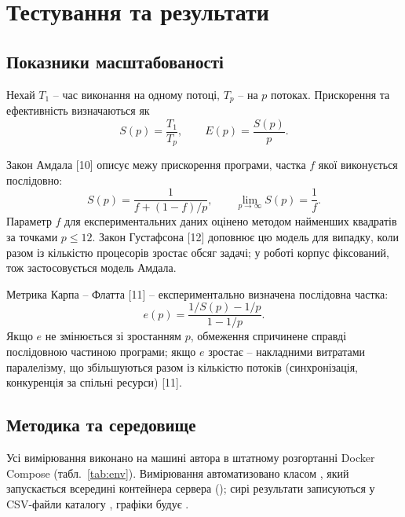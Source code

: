 \section{Тестування та результати}

\subsection{Показники масштабованості}

Нехай $T_1$ -- час виконання на одному потоці, $T_p$ -- на $p$ потоках. Прискорення та
ефективність визначаються як
\begin{equation}
S(p) = \frac{T_1}{T_p}, \qquad E(p) = \frac{S(p)}{p}.
\end{equation}

Закон Амдала [10] описує межу прискорення програми, частка $f$ якої виконується послідовно:
\begin{equation}\label{eq:amdahl}
S(p) = \frac{1}{f + (1 - f)/p}, \qquad \lim_{p \to \infty} S(p) = \frac{1}{f}.
\end{equation}
Параметр $f$ для експериментальних даних оцінено методом найменших квадратів за точками
$p \le 12$. Закон Густафсона [12] доповнює цю модель для випадку, коли разом із кількістю
процесорів зростає обсяг задачі; у роботі корпус фіксований, тож застосовується модель
Амдала.

Метрика Карпа -- Флатта [11] -- експериментально визначена послідовна частка:
\begin{equation}\label{eq:kf}
e(p) = \frac{1/S(p) - 1/p}{1 - 1/p}.
\end{equation}
Якщо $e$ не змінюється зі зростанням $p$, обмеження спричинене справді послідовною частиною
програми; якщо $e$ зростає -- накладними витратами паралелізму, що збільшуються разом із
кількістю потоків (синхронізація, конкуренція за спільні ресурси) [11].

\subsection{Методика та середовище}

Усі вимірювання виконано на машині автора в штатному розгортанні Docker Compose
(табл.~\ref{tab:env}). Вимірювання автоматизовано класом , який запускається
всередині контейнера сервера (); сирі результати записуються у
CSV-файли каталогу , графіки будує .

